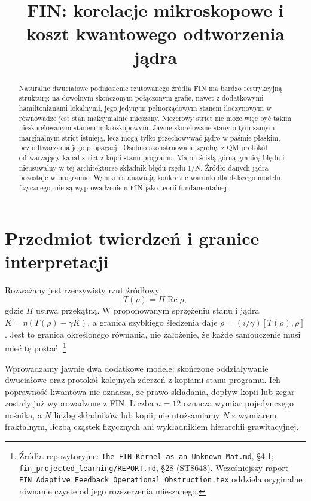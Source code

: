 \documentclass[11pt,a4paper]{article}
\title{FIN: korelacje mikroskopowe i koszt kwantowego odtworzenia jądra}
\author{}
\date{}
\newcommand{\Rea}{\operatorname{Re}}
\begin{document}
\maketitle

\begin{abstract}
Naturalne dwuciałowe podniesienie rzutowanego źródła FIN ma bardzo
restrykcyjną strukturę: na dowolnym skończonym połączonym grafie,
nawet z dodatkowymi hamiltonianami lokalnymi, jego jedynym
pełnorządowym stanem iloczynowym w równowadze jest stan maksymalnie
mieszany. Niezerowy strict nie może więc być takim nieskorelowanym
stanem mikroskopowym. Jawne skorelowane stany o tym samym marginalnym
strict istnieją, lecz mogą tylko przechowywać jądro w paśmie płaskim,
bez odtwarzania jego propagacji. Osobno skonstruowano zgodny z QM
protokół odtwarzający kanał strict z kopii stanu programu. Ma on
ścisłą górną granicę błędu i nieusuwalny w tej architekturze składnik
błędu rzędu $1/N$. Źródło danych jądra pozostaje w programie.
Wyniki ustanawiają konkretne warunki dla dalszego modelu fizycznego;
nie są wyprowadzeniem FIN jako teorii fundamentalnej.
\end{abstract}

\section{Przedmiot twierdzeń i granice interpretacji}

Rozważany jest rzeczywisty rzut źródłowy
\begin{equation}\label{eq:source}
 T(\rho)=\Pi\Rea\rho,
\end{equation}
gdzie $\Pi$ usuwa przekątną. W proponowanym sprzężeniu stanu i jądra
$\dot K=\eta(T(\rho)-\gamma K)$, a granica szybkiego śledzenia daje
$\dot\rho=(i/\gamma)[T(\rho),\rho]$.
Jest to granica określonego równania, nie założenie, że każde
samouczenie musi mieć tę postać.
\footnote{Źródła repozytoryjne: \texttt{The FIN Kernel as an Unknown Mat.md},
§4.1; \texttt{fin\_projected\_learning/REPORT.md}, §28 (ST8648).
Wcześniejszy raport \texttt{FIN\_Adaptive\_Feedback\_Operational\_Obstruction.tex}
oddziela oryginalne równanie czyste od jego rozszerzenia mieszanego.}

Wprowadzamy jawnie dwa dodatkowe modele: skończone oddziaływanie
dwuciałowe oraz protokół kolejnych zderzeń z kopiami stanu programu.
Ich poprawność kwantowa nie oznacza, że prawo składania, dopływ kopii
lub zegar zostały już wyprowadzone z FIN. Liczba $n=12$ oznacza
wymiar pojedynczego nośnika, a $N$ liczbę składników lub kopii;
nie utożsamiamy $N$ z wymiarem fraktalnym, liczbą cząstek fizycznych
ani wykładnikiem hierarchii grawitacyjnej.
\end{document}

